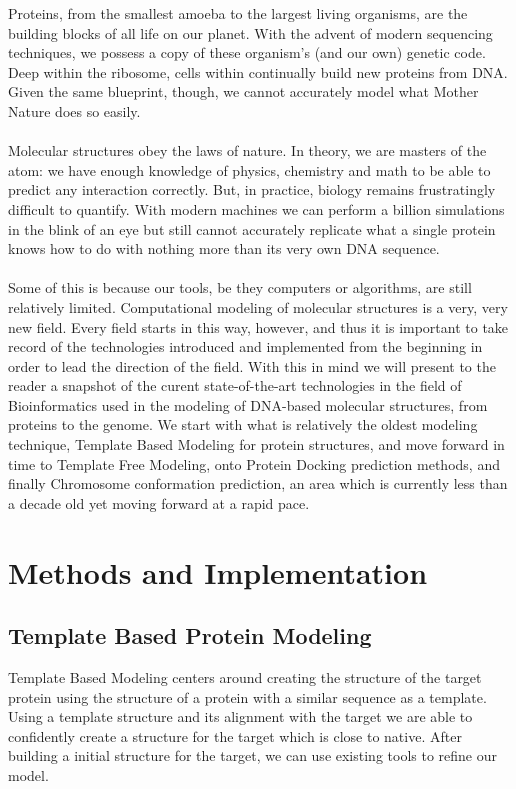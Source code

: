 \documentclass{article}
\begin{document}
Proteins, from the smallest amoeba to the largest living organisms, are the building blocks of all life on our planet.  With the advent of modern sequencing techniques, we possess a copy of these organism's (and our own) genetic code.  Deep within the ribosome, cells within continually build new proteins from DNA.  Given the same blueprint, though, we cannot accurately model what Mother Nature does so easily.\\\\
Molecular structures obey the laws of nature.  In theory, we are masters of the atom: we have enough knowledge of physics, chemistry and math to be able to predict any interaction correctly.  But, in practice, biology remains frustratingly difficult to quantify.  With modern machines we can perform a billion simulations in the blink of an eye but still cannot accurately replicate what a single protein knows how to do with nothing more than its very own DNA sequence.\\\\
Some of this is because our tools, be they computers or algorithms, are still relatively limited.  Computational modeling of molecular structures is a very, very new field.  Every field starts in this way, however, and thus it is important to take record of the technologies introduced and implemented from the beginning in order to lead the direction of the field. With this in mind we will present to the reader a snapshot of the curent state-of-the-art technologies in the field of Bioinformatics used in the modeling of DNA-based molecular structures, from proteins to the genome. We start with what is relatively the oldest modeling technique, Template Based Modeling for protein structures, and move forward in time to Template Free Modeling, onto Protein Docking prediction methods, and finally Chromosome conformation prediction, an area which is currently less than a decade old yet moving forward at a rapid pace.


\section{Methods and Implementation}

\subsection{Template Based Protein Modeling}

Template Based Modeling centers around creating the structure of the target protein using the structure of a protein with a similar sequence as a template. Using a template structure and its alignment with the target we are able to confidently create a structure for the target which is close to native. After building a initial structure for the target, we can use existing tools to refine our model.
\end{document}
